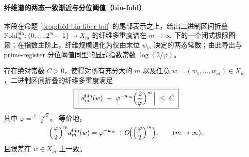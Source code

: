 
\paragraph{纤维谱的两态一致渐近与分位阈值（bin-fold）}
本段在命题 \ref{prop:fold-bin-fiber-tail} 的尾部表示之上，给出二进制区间折叠
\(\mathrm{Fold}^{\mathrm{bin}}_m:\{0,\dots,2^m-1\}\to X_m\)
的纤维多重度谱在 \(m\to\infty\) 下的一个闭式极限图景：在指数主阶上，纤维规模退化为仅由末位 \(w_m\) 决定的两态常数；由此导出与 prime-register 分位阈值同型的显式指数常数 \(\log(2/\varphi)\)。

\begin{theorem}\label{thm:fold-bin-two-state-asymptotic}
存在绝对常数 \(C>0\)，使得对所有充分大的 \(m\) 以及任意 \(w=(w_1,\dots,w_m)\in X_m\)，二进制区间折叠的纤维多重度满足
\begin{equation}\label{eq:fold-bin-two-state-asymptotic}
\boxed{\;
\Bigl|\,d^{\mathrm{bin}}_m(w)\ -\ \varphi^{-w_m}\Bigl(\frac{2}{\varphi}\Bigr)^m\,\Bigr|\ \le\ C\;}
\end{equation}
其中 \(\varphi=\frac{1+\sqrt5}{2}\)。
等价地，
\[
\Bigl(\frac{\varphi}{2}\Bigr)^m d^{\mathrm{bin}}_m(w)
=\varphi^{-w_m}+O\!\Bigl(\Bigl(\frac{\varphi}{2}\Bigr)^m\Bigr),
\qquad (m\to\infty),
\]
且误差在 \(w\in X_m\) 上一致。
\end{theorem}

